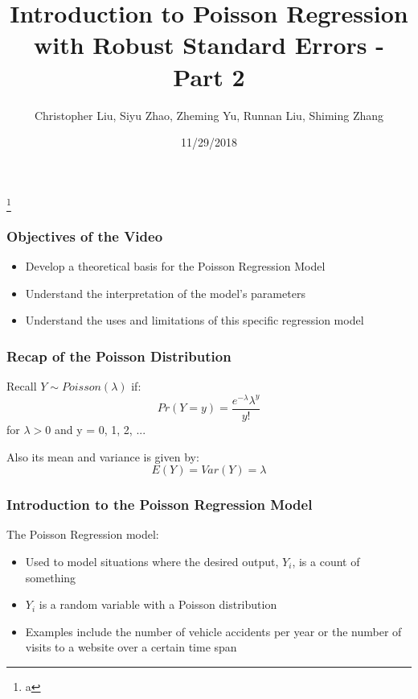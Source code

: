 \documentclass{beamer}
\title{Introduction to Poisson Regression with Robust Standard Errors - Part 2}
\author{Christopher Liu, Siyu Zhao, Zheming Yu, Runnan Liu, Shiming Zhang}
\institute{San Diego State University, Stats 610}
\date{11/29/2018}
\begin{document}
	

\begin{frame}[plain]

	\titlepage
	
	\footnote{a}

\end{frame}



\begin{frame}[fragile]\frametitle{Objectives of the Video}

	\begin{itemize}
	
		\item Develop a theoretical basis for the Poisson Regression Model
		
		\item Understand the interpretation of the model's parameters
		
		\item Understand the uses and limitations of this specific regression model
	
	\end{itemize}	

\end{frame}



\begin{frame}[fragile]\frametitle{Recap of the Poisson Distribution}

	Recall $Y \sim Poisson(\lambda)$ if:
	$$ Pr(Y = y) = \frac{e^{-\lambda}\lambda^{y}}{y!} $$
	for $\lambda > 0$ and y = 0, 1, 2, ... 
 
	Also its mean and variance is given by:
	$$ E(Y) = Var(Y) = \lambda $$ 

\end{frame}



\begin{frame}[fragile]\frametitle{Introduction to the Poisson Regression Model}
	The Poisson Regression model:
	
	\begin{itemize}
	
		\item Used to model situations where the desired output, $Y_{i}$, is a count of something
		
		\item $Y_i$ is a random variable with a Poisson distribution
		
		\item Examples include the number of vehicle accidents per year or the number of visits to a website over a certain time span

	\end{itemize}

\end{frame}
\end{document}
